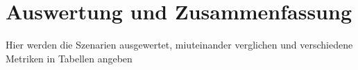 %
\chapter{Auswertung und Zusammenfassung}


Hier werden die Szenarien ausgewertet, miuteinander verglichen und verschiedene Metriken in Tabellen angeben